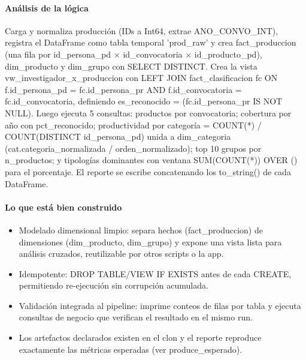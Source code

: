 \paragraph{Análisis de la lógica}
Carga y normaliza producción (IDs a Int64, extrae ANO\_CONVO\_INT), registra el DataFrame como tabla temporal 'prod\_raw' y crea fact\_produccion (una fila por id\_persona\_pd $\times$ id\_convocatoria $\times$ id\_producto\_pd), dim\_producto y dim\_grupo con SELECT DISTINCT. Crea la vista vw\_investigador\_x\_produccion con LEFT JOIN fact\_clasificacion fc ON f.id\_persona\_pd = fc.id\_persona\_pr AND f.id\_convocatoria = fc.id\_convocatoria, definiendo es\_reconocido = (fc.id\_persona\_pr IS NOT NULL). Luego ejecuta 5 consultas: productos por convocatoria; cobertura por año con pct\_reconocido; productividad por categoría = COUNT(*) / COUNT(DISTINCT id\_persona\_pd) unida a dim\_categoria (cat.categoria\_normalizada / orden\_normalizado); top 10 grupos por n\_productos; y tipologías dominantes con ventana SUM(COUNT(*)) OVER () para el porcentaje. El reporte se escribe concatenando los to\_string() de cada DataFrame.

\paragraph{Lo que está bien construido}
\begin{itemize}
  \item Modelado dimensional limpio: separa hechos (fact\_produccion) de dimensiones (dim\_producto, dim\_grupo) y expone una vista lista para análisis cruzados, reutilizable por otros scripts o la app.
  \item Idempotente: DROP TABLE/VIEW IF EXISTS antes de cada CREATE, permitiendo re-ejecución sin corrupción acumulada.
  \item Validación integrada al pipeline: imprime conteos de filas por tabla y ejecuta consultas de negocio que verifican el resultado en el mismo run.
  \item Los artefactos declarados existen en el clon y el reporte reproduce exactamente las métricas esperadas (ver produce\_esperado).
\end{itemize}

